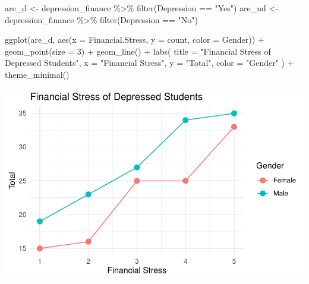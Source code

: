 \documentclass[
  letterpaper,
  DIV=11,
  numbers=noendperiod]{scrartcl}
\newenvironment{Shaded}{\begin{snugshade}}{\end{snugshade}}
\newcommand{\AttributeTok}[1]{\textcolor[rgb]{0.40,0.45,0.13}{#1}}
\newcommand{\DecValTok}[1]{\textcolor[rgb]{0.68,0.00,0.00}{#1}}
\newcommand{\FunctionTok}[1]{\textcolor[rgb]{0.28,0.35,0.67}{#1}}
\newcommand{\NormalTok}[1]{\textcolor[rgb]{0.00,0.23,0.31}{#1}}
\newcommand{\OtherTok}[1]{\textcolor[rgb]{0.00,0.23,0.31}{#1}}
\newcommand{\SpecialCharTok}[1]{\textcolor[rgb]{0.37,0.37,0.37}{#1}}
\newcommand{\StringTok}[1]{\textcolor[rgb]{0.13,0.47,0.30}{#1}}
\begin{document}
\begin{Shaded}
\begin{Highlighting}[]
\NormalTok{are\_d }\OtherTok{\textless{}{-}}\NormalTok{ depression\_finance }\SpecialCharTok{\%\textgreater{}\%} \FunctionTok{filter}\NormalTok{(Depression }\SpecialCharTok{==} \StringTok{"Yes"}\NormalTok{)}
\NormalTok{are\_nd }\OtherTok{\textless{}{-}}\NormalTok{ depression\_finance }\SpecialCharTok{\%\textgreater{}\%} \FunctionTok{filter}\NormalTok{(Depression }\SpecialCharTok{==} \StringTok{"No"}\NormalTok{)}

\FunctionTok{ggplot}\NormalTok{(are\_d, }\FunctionTok{aes}\NormalTok{(}\AttributeTok{x =}\NormalTok{ Financial.Stress, }\AttributeTok{y =}\NormalTok{ count, }\AttributeTok{color =}\NormalTok{ Gender)) }\SpecialCharTok{+}
  \FunctionTok{geom\_point}\NormalTok{(}\AttributeTok{size =} \DecValTok{3}\NormalTok{) }\SpecialCharTok{+}    
  \FunctionTok{geom\_line}\NormalTok{() }\SpecialCharTok{+}       
  \FunctionTok{labs}\NormalTok{(}
    \AttributeTok{title =} \StringTok{"Financial Stress of Depressed Students"}\NormalTok{,}
    \AttributeTok{x =} \StringTok{"Financial Stress"}\NormalTok{,}
    \AttributeTok{y =} \StringTok{"Total"}\NormalTok{,}
    \AttributeTok{color =} \StringTok{"Gender"}
\NormalTok{  ) }\SpecialCharTok{+}
  \FunctionTok{theme\_minimal}\NormalTok{() }
\end{Highlighting}
\end{Shaded}

\includegraphics{Data_files/figure-pdf/unnamed-chunk-10-1.pdf}
\end{document}
